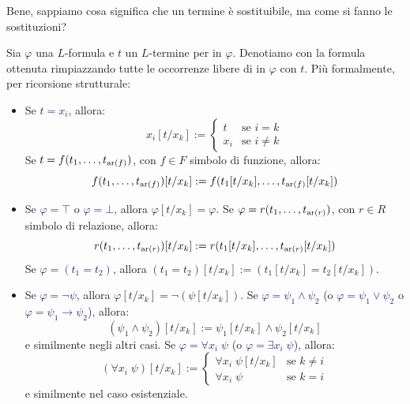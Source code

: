 Bene, sappiamo cosa significa che un termine è sostituibile, ma come si fanno le sostituzioni?

\begin{definition}
    Sia $\varphi$ una $L$-formula e $t$ un $L$-termine  per  in $\varphi$. Denotiamo con \vocab{$\varphi[t/x_k]$} la formula ottenuta rimpiazzando tutte le
    occorrenze libere di  in $\varphi$ con $t$. Più formalmente, per ricorsione strutturale:
    \begin{itemize}
        \item [$\boxed{\text{$L$-termini}}$] Se \textcolor{MidnightBlue}{$t = x_i$}, allora:
        \[ x_i[t/x_k] := \begin{cases}
            t &\text{se $i = k$} \\
            x_i &\text{se $i \neq k$}
        \end{cases}
        \]
        Se \textcolor{MidnightBlue}{$t = f(t_1,\ldots,t_{\operatorname{ar}(f)})$}, con $f \in F$ simbolo di funzione, allora:
        \[ f(t_1,\ldots,t_{\operatorname{ar}(f)})[t/x_k] := f(t_1[t/x_k],\ldots,t_{\operatorname{ar}(f)}[t/x_k])
        \]
        \item[$\boxed{\text{$L$-formule atomiche}}$] Se \textcolor{MidnightBlue}{$\varphi = \top$} o \textcolor{MidnightBlue}{$\varphi = \bot$}, allora $\varphi[t/x_k] = \varphi$. Se \textcolor{MidnightBlue}{$\varphi = r(t_1,\ldots,t_{\operatorname{ar}(r)})$}, con $r \in R$ simbolo di relazione, allora:
        \[ r(t_1,\ldots,t_{\operatorname{ar}(r)})[t/x_k] := r(t_1[t/x_k],\ldots,t_{\operatorname{ar}(r)}[t/x_k])
        \]
        Se \textcolor{MidnightBlue}{$\varphi = (t_1 = t_2)$}, allora $(t_1 = t_2)[t/x_k] := (t_1[t/x_k] = t_2[t/x_k])$.
        \item [$\boxed{\text{$L$-formule}}$] Se \textcolor{MidnightBlue}{$\varphi = \neg \psi$}, allora $\varphi[t/x_k] = \neg (\psi[t/x_k])$. Se \textcolor{MidnightBlue}{$\varphi = \psi_1 \land \psi_2$} (o \textcolor{MidnightBlue}{$\varphi = \psi_1 \lor \psi_2$} o \textcolor{MidnightBlue}{$\varphi = \psi_1 \to \psi_2$}), allora:
        \[ (\psi_1 \land \psi_2)[t/x_k] := \psi_1[t/x_k] \land \psi_2[t/x_k]
        \]
        e similmente negli altri casi. Se \textcolor{MidnightBlue}{$\varphi = \forall x_i \; \psi$} (o \textcolor{MidnightBlue}{$\varphi = \exists x_i \; \psi$}), allora:
        \[ (\forall x_i \; \psi)[t/x_k] := \begin{cases}
            \forall x_i \; \psi[t/x_k] &\text{se $k \ne i$} \\
            \forall x_i \; \psi &\text{se $k = i$}
        \end{cases}
        \]
        e similmente nel caso esistenziale.
    \end{itemize}
\end{definition}

